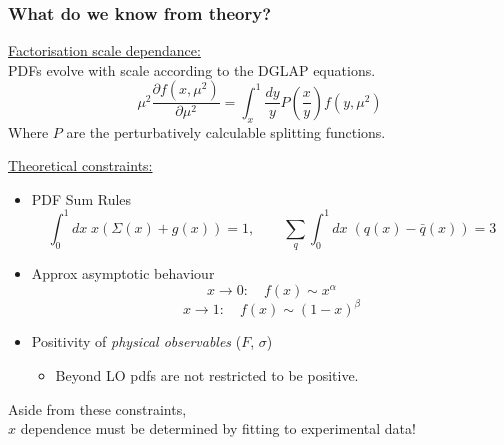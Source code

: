 \documentclass[10pt]{beamer}
\newcommand{\be}{\begin{equation*}}
\newcommand{\ee}{\end{equation*}}
\begin{document}
\begin{frame}
\begin{columns}
\begin{column}{0.3\textwidth}
{%
      }
      
      \end{column}
      
      
 \end{columns}
      \vskip10pt



\end{frame}

\begin{frame}
\frametitle{What do we know from theory?}
\small \underline{Factorisation scale dependance:} \\
PDFs evolve with scale according to the DGLAP equations.
\be \mu^2 \frac{\partial f(x,\mu^2)}{\partial \mu^2} = \int_x^1 \frac{dy}{y} P\left( \frac{x}{y} \right) f (y,\mu^2)  \ee
Where $P$ are the perturbatively calculable splitting functions.

\small \underline{Theoretical constraints:} \\
\begin{itemize}
\item PDF Sum Rules
\be \int_0^1 dx\; x(\Sigma(x) + g(x)) = 1,\quad\quad   \sum_{q} \int_0^1 dx\; (q(x)-\bar{q}(x)) = 3 \ee
\end{itemize}

\begin{itemize}
\item Approx asymptotic behaviour
\be x \to 0: \quad f(x) \sim x^{\alpha}\ee
\be x \to 1: \quad f(x) \sim (1-x)^{\beta}\ee
\end{itemize}

\begin{itemize}
\item Positivity of \emph{physical observables} ($F$, $\sigma$)
\begin{itemize}
\item Beyond LO pdfs are not restricted to be positive.
\end{itemize}
\end{itemize}

\begin{center}
Aside from these constraints,\\ $x$ dependence must be determined by fitting to experimental data!
\end{center}


\end{frame}
\end{document}
